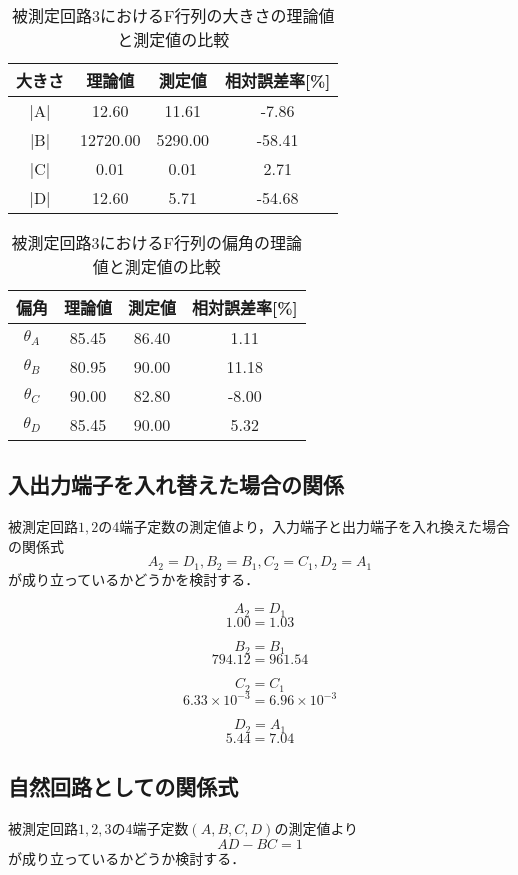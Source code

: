 \newpage

\begin{table}[!ht]
    \centering
    \caption{被測定回路3におけるF行列の大きさの理論値と測定値の比較}
    \begin{tabular}{c|ccc}
    \hline
        大きさ & 理論値 & 測定値 & 相対誤差率[\%] \\ \hline
        |A| & 12.60 & 11.61 & -7.86 \\ 
        |B| & 12720.00 & 5290.00 & -58.41 \\ 
        |C| & 0.01 & 0.01 & 2.71 \\ 
        |D| & 12.60 & 5.71 & -54.68 \\ 
    \end{tabular}
\end{table}

\begin{table}[!ht]
    \centering
    \caption{被測定回路3におけるF行列の偏角の理論値と測定値の比較}
    \begin{tabular}{c|ccc}
    \hline
        偏角 & 理論値 & 測定値 & 相対誤差率[\%] \\ \hline
        $\theta_A$ & 85.45 & 86.40 & 1.11 \\ 
        $\theta_B$ & 80.95 & 90.00 & 11.18 \\
        $\theta_C$ & 90.00 & 82.80 & -8.00 \\
        $\theta_D$ & 85.45 & 90.00 & 5.32 \\ 
    \end{tabular}
\end{table}



\subsection{入出力端子を入れ替えた場合の関係}
被測定回路$1,2$の4端子定数の測定値より，入力端子と出力端子を入れ換えた場合の関係式
$$
A_2=D_1, B_2=B_1, C_2=C_1, D_2=A_1
$$
が成り立っているかどうかを検討する．

$$A_2=D_1$$
$$1.00=1.03$$

$$B_2=B_1$$
$$794.12=961.54$$

$$C_2=C_1$$
$$6.33\times10^{-3}=6.96\times10^{-3}$$

$$D_2=A_1$$
$$5.44=7.04$$

\subsection{自然回路としての関係式}
被測定回路$1,2,3$の4端子定数$(A, B, C, D)$の測定値より
$$
A D-B C=1
$$
が成り立っているかどうか検討する． 

